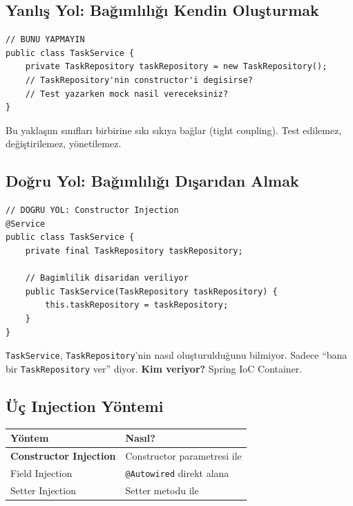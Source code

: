 \documentclass[11pt,a4paper]{article}
\begin{document}
\subsection*{Yanl{\i}\c{s} Yol: Ba\u{g}{\i}ml{\i}l{\i}\u{g}{\i} Kendin Olu\c{s}turmak}

\begin{lstlisting}[style=java]
// BUNU YAPMAYIN
public class TaskService {
    private TaskRepository taskRepository = new TaskRepository();
    // TaskRepository'nin constructor'i degisirse?
    // Test yazarken mock nasil vereceksiniz?
}
\end{lstlisting}

Bu yakla\c{s}{\i}m s{\i}n{\i}flar{\i} birbirine s{\i}k{\i} s{\i}k{\i}ya ba\u{g}lar (tight coupling). Test edilemez, de\u{g}i\c{s}tirilemez, y\"{o}netilemez.

\subsection*{Do\u{g}ru Yol: Ba\u{g}{\i}ml{\i}l{\i}\u{g}{\i} D{\i}\c{s}ar{\i}dan Almak}

\begin{lstlisting}[style=java]
// DOGRU YOL: Constructor Injection
@Service
public class TaskService {
    private final TaskRepository taskRepository;

    // Bagimlilik disaridan veriliyor
    public TaskService(TaskRepository taskRepository) {
        this.taskRepository = taskRepository;
    }
}
\end{lstlisting}

\texttt{TaskService}, \texttt{TaskRepository}'nin nas{\i}l olu\c{s}turuldu\u{g}unu bilmiyor. Sadece ``bana bir \texttt{TaskRepository} ver'' diyor. \textbf{Kim veriyor?} Spring IoC Container.

\subsection*{\"{U}\c{c} Injection Y\"{o}ntemi}

\begin{center}
\begin{tabular}{p{4.5cm}p{8cm}}
\toprule
\textbf{Y\"{o}ntem} & \textbf{Nas{\i}l?} \\
\midrule
\textbf{Constructor Injection} & Constructor parametresi ile \\
Field Injection & \texttt{@Autowired} direkt alana \\
Setter Injection & Setter metodu ile \\
\bottomrule
\end{tabular}
\end{center}
\end{document}
